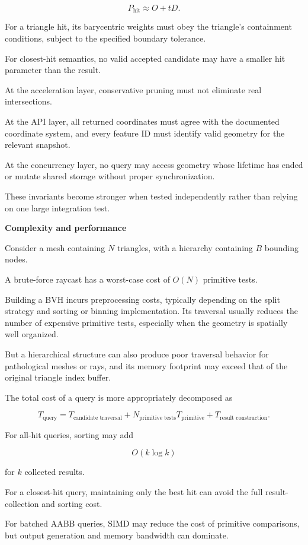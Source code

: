 \[
P_{\text{hit}}\approx O+tD.
\]

For a triangle hit, its barycentric weights must obey the triangle's containment conditions, subject to the specified boundary tolerance.

For closest-hit semantics, no valid accepted candidate may have a smaller hit parameter than the result.

At the acceleration layer, conservative pruning must not eliminate real intersections.

At the API layer, all returned coordinates must agree with the documented coordinate system, and every feature ID must identify valid geometry for the relevant snapshot.

At the concurrency layer, no query may access geometry whose lifetime has ended or mutate shared storage without proper synchronization.

These invariants become stronger when tested independently rather than relying on one large integration test.

\textbf{Complexity and performance}

Consider a mesh containing \(N\) triangles, with a hierarchy containing \(B\) bounding nodes.

A brute-force raycast has a worst-case cost of \(O(N)\) primitive tests.

Building a BVH incurs preprocessing costs, typically depending on the split strategy and sorting or binning implementation. Its traversal usually reduces the number of expensive primitive tests, especially when the geometry is spatially well organized.

But a hierarchical structure can also produce poor traversal behavior for pathological meshes or rays, and its memory footprint may exceed that of the original triangle index buffer.

The total cost of a query is more appropriately decomposed as

\[
T_{\text{query}} = T_{\text{candidate traversal}} + N_{\text{primitive tests}}T_{\text{primitive}} + T_{\text{result construction}}.
\]

For all-hit queries, sorting may add

\[
O(k\log k)
\]

for \(k\) collected results.

For a closest-hit query, maintaining only the best hit can avoid the full result-collection and sorting cost.

For batched AABB queries, SIMD may reduce the cost of primitive comparisons, but output generation and memory bandwidth can dominate.

